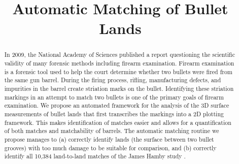 \documentclass[aoas, preprint]{imsart}\usepackage[]{graphicx}\usepackage[]{color}
\begin{document}
\begin{frontmatter}

\title{Automatic Matching of Bullet Lands}

%
\begin{abstract}
In 2009, the National Academy of Sciences published a report questioning the scientific validity of many forensic methods including firearm examination. Firearm examination is a forensic tool used to help the court determine whether two bullets were fired from the same gun barrel. During the firing process, rifling, manufacturing defects, and impurities in the barrel create striation marks on the bullet. Identifying these striation markings in an attempt to match two bullets is one of the primary goals of firearm examination. We propose an automated framework for the analysis of the 3D surface measurements of bullet lands that first transcribes the markings into a 2D plotting framework. This makes identification of matches easier and allows for a quantification of both matches and matchability of barrels. The automatic matching routine we propose manages to (a) correctly identify lands (the surface between two bullet grooves) with too much damage to be suitable for comparison, and (b) correctly identify all 10,384 land-to-land matches of the James Hamby study \citep{hamby:2009}.
\end{abstract}


\end{frontmatter}
\end{document}
